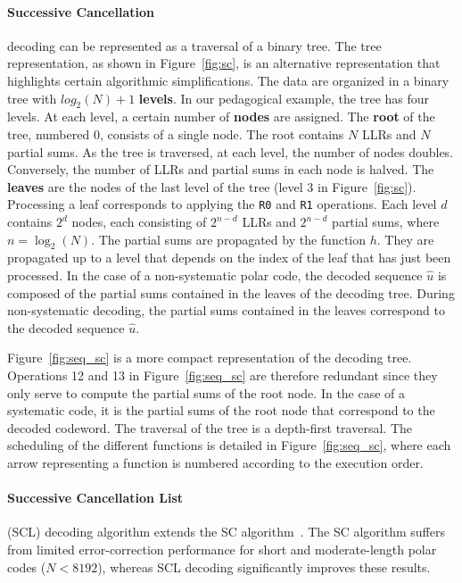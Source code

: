 \documentclass[11pt]{report}
\begin{document}
\paragraph{Successive Cancellation} decoding can be represented as a traversal of a binary tree. The tree representation, as shown in Figure~\ref{fig:sc}, is an alternative representation that highlights certain algorithmic simplifications.
The data are organized in a binary tree with $log_2(N) + 1$ \textbf{levels}. In our pedagogical example, the tree has four levels.
At each level, a certain number of \textbf{nodes} are assigned.
The \textbf{root} of the tree, numbered $0$, consists of a single node.
The root contains $N$ LLRs and $N$ partial sums.
As the tree is traversed, at each level, the number of nodes doubles.
Conversely, the number of LLRs and partial sums in each node is halved.
The \textbf{leaves} are the nodes of the last level of the tree (level 3 in Figure~\ref{fig:sc}).
Processing a leaf corresponds to applying the \texttt{R0} and \texttt{R1} operations.
Each level $d$ contains $2^d$ nodes, each consisting of $2^{n-d}$ LLRs and $2^{n-d}$ partial sums, where $n=\log_2(N)$.
The partial sums are propagated by the function $h$. They are propagated up to a level that depends on the index of the leaf that has just been processed.
In the case of a non-systematic polar code, the decoded sequence $\hat{u}$ is composed of the partial sums contained in the leaves of the decoding tree.
During non-systematic decoding, the partial sums contained in the leaves correspond to the decoded sequence $\hat{u}$.

Figure~\ref{fig:seq_sc} is a more compact representation of the decoding tree.
Operations 12 and 13 in Figure~\ref{fig:seq_sc} are therefore redundant since they only serve to compute the partial sums of the root node.
In the case of a systematic code, it is the partial sums of the root node that correspond to the decoded codeword.
The traversal of the tree is a depth-first traversal.
The scheduling of the different functions is detailed in Figure~\ref{fig:seq_sc}, where each arrow representing a function is numbered according to the execution order.



\paragraph{Successive Cancellation List} (SCL) decoding algorithm extends the SC algorithm~\cite{Tal2015}. The SC algorithm suffers from limited error-correction performance for short and moderate-length polar codes ($N < 8192$), whereas SCL decoding significantly improves these results.
\end{document}
